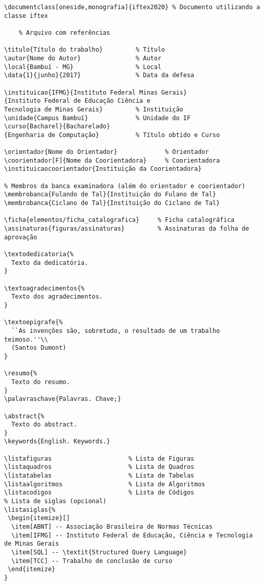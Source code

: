\begin{Verbatim}[frame=single, fontsize=\scriptsize]
\documentclass[oneside,monografia]{iftex2020} % Documento utilizando a classe iftex

    % Arquivo com referências

\titulo{Título do trabalho}         % Título
\autor{Nome do Autor}               % Autor
\local{Bambuí - MG}                 % Local
\data{1}{junho}{2017}               % Data da defesa

\instituicao{IFMG}{Instituto Federal Minas Gerais}
{Instituto Federal de Educação Ciência e
Tecnologia de Minas Gerais}         % Instituição
\unidade{Campus Bambuí}             % Unidade do IF
\curso{Bacharel}{Bacharelado}
{Engenharia de Computação}          % Título obtido e Curso

\orientador{Nome do Orientador}             % Orientador
\coorientador[F]{Nome da Coorientadora}     % Coorientadora
\instituicaocoorientador{Instituição da Coorientadora}

% Membros da banca examinadora (além do orientador e coorientador)
\membrobanca{Fulando de Tal}{Instituição do Fulano de Tal}
\membrobanca{Ciclano de Tal}{Instituição do Ciclano de Tal}

\ficha{elementos/ficha_catalografica}     % Ficha catalográfica
\assinaturas{figuras/assinaturas}         % Assinaturas da folha de aprovação

\textodedicatoria{%
  Texto da dedicatória.
}

\textoagradecimentos{%
  Texto dos agradecimentos.
}

\textoepigrafe{%
  ``As invenções são, sobretudo, o resultado de um trabalho teimoso.''\\
  (Santos Dumont)
}

\resumo{%
  Texto do resumo.
}
\palavraschave{Palavras. Chave;}

\abstract{%
  Texto do abstract.
}
\keywords{English. Keywords.}

\listafiguras                     % Lista de Figuras
\listaquadros                     % Lista de Quadros
\listatabelas                     % Lista de Tabelas
\listaalgoritmos                  % Lista de Algoritmos
\listacodigos                     % Lista de Códigos
% Lista de siglas (opcional)
\listasiglas{%
 \begin{itemize}[]
  \item[ABNT] -- Associação Brasileira de Normas Técnicas
  \item[IFMG] -- Instituto Federal de Educação, Ciência e Tecnologia de Minas Gerais
  \item[SQL] -- \textit{Structured Query Language}
  \item[TCC] -- Trabalho de conclusão de curso
 \end{itemize}
}


\end{Verbatim}
